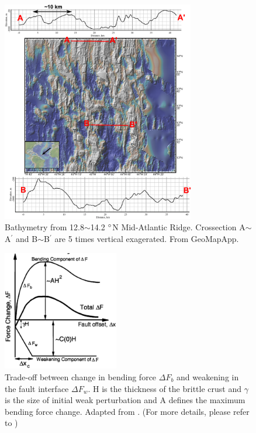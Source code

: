 \documentclass[draft,gc]{agutex}
\begin{document}
\begin{figure}[h]
\noindent\includegraphics[width=0.75\textwidth]{./Figures/fig_Discussion_Observation_2_13-14N_MAR.eps}
 \caption[Bathymetry from 12.8$\sim$14.2 $\degree$N Mid-Atlantic Ridge.]{Bathymetry from 12.8$\sim$14.2 $\degree$N Mid-Atlantic Ridge. Crossection A$\sim$A$^{\prime}$ and B$\sim$B$^{\prime}$ are 5 times vertical exagerated. From GeoMapApp.}
 \label{fig_Discussion_Observation_2_13-14N_MAR}
\end{figure}

\begin{figure}[h]
\noindent\includegraphics[width=0.45\textwidth]{./Figures/fig_Results_Weakening_1_tradeOff_bend_weak.eps}
 \caption[Trade-off between change in bending force $\Delta F_{b}$ and weakening in the fault interface $\Delta F_{w}$. Adapted from \citep{Lavier2000}.]{Trade-off between change in bending force $\Delta F_{b}$ and weakening in the fault interface $\Delta F_{w}$. H is the thickness of the brittle crust and $\gamma$ is the size of initial weak perturbation and A defines the maximum bending force change. Adapted from \citep{Lavier2000}. (For more details, please refer to \citep{Lavier2000})}
 \label{fig_Results_Weakening_1}
\end{figure}
\end{document}
